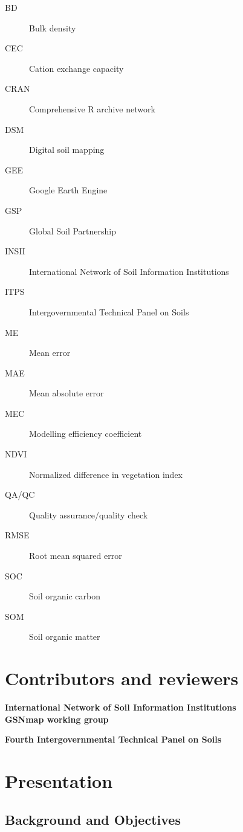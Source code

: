 \documentclass[
  10pt,
  b5paper,
  oneside]{book}
\begin{document}
\begin{description}
\item[BD]
Bulk density
\item[CEC]
Cation exchange capacity
\item[CRAN]
Comprehensive R archive network
\item[DSM]
Digital soil mapping
\item[GEE]
Google Earth Engine
\item[GSP]
Global Soil Partnership
\item[INSII]
International Network of Soil Information Institutions
\item[ITPS]
Intergovernmental Technical Panel on Soils
\item[ME]
Mean error
\item[MAE]
Mean absolute error
\item[MEC]
Modelling efficiency coefficient
\item[NDVI]
Normalized difference in vegetation index
\item[QA/QC]
Quality assurance/quality check
\item[RMSE]
Root mean squared error
\item[SOC]
Soil organic carbon
\item[SOM]
Soil organic matter
\end{description}

\hypertarget{contributors-and-reviewers}{%
\chapter*{Contributors and reviewers}\label{contributors-and-reviewers}}

\textbf{International Network of Soil Information Institutions}\\

\textbf{GSNmap working group}

\textbf{Fourth Intergovernmental Technical Panel on Soils}\\

\mainmatter

\hypertarget{presentation}{%
\chapter{Presentation}\label{presentation}}

\hypertarget{background-and-objectives}{%
\section{Background and Objectives}\label{background-and-objectives}}
\end{document}
